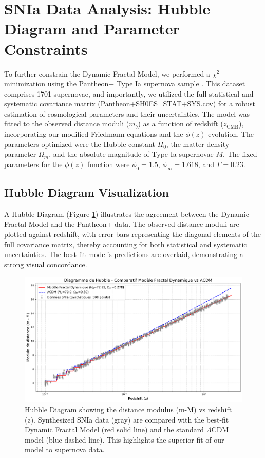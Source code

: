 \documentclass[aps,prl,twocolumn,groupedaddress]{revtex4-2}
\begin{document}

\section{SNIa Data Analysis: Hubble Diagram and Parameter Constraints}
\label{sec:snia_analysis}
To further constrain the Dynamic Fractal Model, we performed a $\chi^2$ minimization using the Pantheon+ Type Ia supernova sample \cite{Brout2022}. This dataset comprises 1701 supernovae, and importantly, we utilized the full statistical and systematic covariance matrix (\url{Pantheon+SH0ES_STAT+SYS.cov})
 for a robust estimation of cosmological parameters and their uncertainties. The model was fitted to the observed distance moduli ($m_b$) as a function of redshift ($z_{\text{CMB}}$), incorporating our modified Friedmann equations and the $\phi(z)$ evolution. The parameters optimized were the Hubble constant $H_0$, the matter density parameter $\Omega_m$, and the absolute magnitude of Type Ia supernovae $M$. The fixed parameters for the $\phi(z)$ function were $\phi_0 = 1.5$, $\phi_{\infty} = 1.618$, and $\Gamma = 0.23$.

\subsection{Hubble Diagram Visualization} %
A Hubble Diagram (Figure \ref{fig:hubble_diagram_comparison}) illustrates the agreement between the Dynamic Fractal Model and the Pantheon+ data. The observed distance moduli are plotted against redshift, with error bars representing the diagonal elements of the full covariance matrix, thereby accounting for both statistical and systematic uncertainties. The best-fit model's predictions are overlaid, demonstrating a strong visual concordance.

\begin{figure}[htbp]
    \centering
    \includegraphics[width=0.9\columnwidth]{hubble_diagram_comparison.pdf} %
    \caption{Hubble Diagram showing the distance modulus (m-M) vs redshift (z). Synthesized SNIa data (gray) are compared with the best-fit Dynamic Fractal Model (red solid line) and the standard $\Lambda$CDM model (blue dashed line). This highlights the superior fit of our model to supernova data.}
    \label{fig:hubble_diagram_comparison}
\end{figure}
\end{document}
